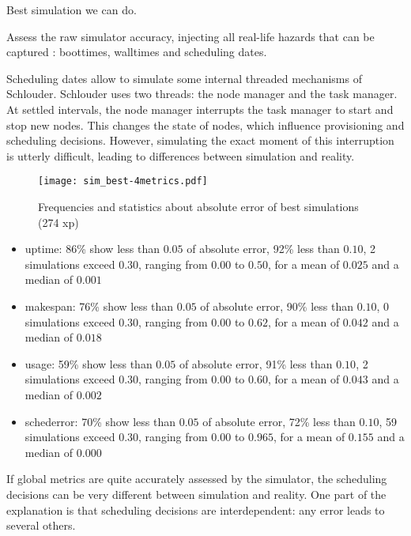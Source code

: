 \documentclass[parallelisme]{compas2017}
\newcommand\vrpath{../../lab/setup/simschlouder/validation-results/}
\begin{document}
Best simulation we can do.

Assess the raw simulator accuracy, injecting all real-life hazards that can be 
captured :
boottimes, walltimes and scheduling dates.

Scheduling dates allow to simulate some internal threaded mechanisms of 
Schlouder.
Schlouder uses two threads: the node manager and the task manager.
At settled intervals, the node manager interrupts the task manager to start and 
stop new nodes.
This changes the state of nodes, which influence provisioning and scheduling 
decisions.
However, simulating the exact moment of this interruption is utterly difficult, 
leading to differences between simulation and reality.


\begin{figure}
  \centering

  \texttt{[image: sim\_best-4metrics.pdf]}
  
  
  
\caption{Frequencies and statistics about absolute error of best simulations (274 xp)}
\end{figure} 

 


\begin{itemize}
 \item uptime: 
      86\% show less than $0.05$ of absolute error, 
      92\% less than $0.10$, 
      2 simulations exceed $0.30$,
      ranging from $0.00$ to $0.50$, for a mean of $0.025$ and a median of $0.001$
 \item makespan: 
      76\% show less than $0.05$ of absolute error, 
      90\% less than $0.10$, 
      0 simulations exceed $0.30$,
      ranging from $0.00$ to $0.62$, for a mean of $0.042$ and a median of $0.018$
 \item usage: 
      59\% show less than $0.05$ of absolute error, 
      91\% less than $0.10$, 
      2 simulations exceed $0.30$,
      ranging from $0.00$ to $0.60$, for a mean of $0.043$ and a median of $0.002$
 \item schederror: 
      70\% show less than $0.05$ of absolute error, 
      72\% less than $0.10$, 
      59 simulations exceed $0.30$,
      ranging from $0.00$ to $0.965$, for a mean of $0.155$ and a median of $0.000$
\end{itemize}

If global metrics are quite accurately assessed by the simulator, 
the scheduling decisions can be very different between simulation and reality. 
One part of the explanation is that scheduling decisions are interdependent: 
any error leads to several others.
\end{document}
